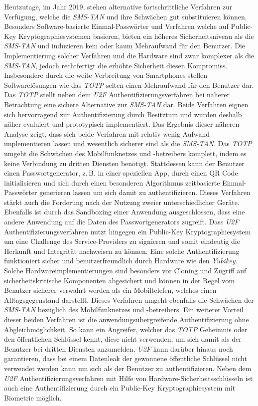 \documentclass[11pt,a4paper,ngerman]{scrreprt}
\begin{document}
Heutzutage, im Jahr 2019, stehen alternative fortschrittliche Verfahren zur Verfügung, welche die \textit{SMS-TAN} und ihre Schwächen gut substituieren können. Besonders Software-basierte Einmal-Passwörter und Verfahren welche auf Public-Key Kryptographiesystemen basieren, bieten ein höheres Sicherheitsniveau als die \textit{SMS-TAN} und induzieren kein oder kaum Mehraufwand für den Benutzer. Die Implementierung solcher Verfahren und die Hardware sind zwar komplexer als die \textit{SMS-TAN}, jedoch rechtfertigt die erhöhte Sicherheit diesen Kompromiss. Insbesondere durch die weite Verbreitung von Smartphones stellen Softwarelösungen wie das \textit{TOTP} selten einen Mehraufwand für den Benutzer dar. Das \textit{TOTP} stellt neben dem \textit{U2F} Authentifizierungsverfahren bei näherer Betrachtung eine sichere Alternative zur \textit{SMS-TAN} dar. Beide Verfahren eignen sich hervorragend zur Authentifizierung durch Besitztum und wurden deshalb näher evaluiert und prototypisch implementiert. Das Ergebnis dieser näheren Analyse zeigt, dass sich beide Verfahren mit relativ wenig Aufwand implementieren lassen und wesentlich sicherer sind als die \textit{SMS-TAN}. Das \textit{TOTP} umgeht die Schwächen des Mobilfunknetzes und -betreibers komplett, indem es keine Verbindung zu dritten Diensten benötigt. Stattdessen kann der Benutzer einen Passwortgenerator, z.\,B. in einer speziellen App, durch einen QR Code initialisieren und sich durch einen besonderen Algorithmus zeitbasierte Einmal-Passwörter generieren lassen um sich damit zu authentifizieren. Dieses Verfahren stärkt auch die Forderung nach der Nutzung zweier unterschiedlicher Geräte. Ebenfalls ist durch das Sandboxing einer Anwendung ausgeschlossen, dass eine andere Anwendung auf die Daten des Passwortgenerators zugreift. Dass \textit{U2F} Authentifizierungsverfahren nutzt hingegen ein Public-Key Kryptographiesystem um eine Challenge des Service-Providers zu signieren und somit eindeutig die Herkunft und Integrität nachweisen zu können. Eine solche Authentifizierung funktioniert sicher und benutzerfreundlich durch Hardware wie den \textit{Yubikey}. Solche Hardwareimplementierungen sind besonders vor Cloning und Zugriff auf sicherheitskritische Komponenten abgesichert und können in der Regel vom Benutzer sicherer verwahrt werden als ein Mobiltelefen, welches einen Alltagsgegenstand darstellt. Dieses Verfahren umgeht ebenfalls die Schwächen der \textit{SMS-TAN} bezüglich des Mobilfunknetzes und -betreibers. Ein weiterer Vorteil dieser beiden Verfahren ist die anwendungsübergreifende Authentifizierung ohne Abgleichmöglichkeit. So kann ein Angreifer, welcher das \textit{TOTP} Geheimnis oder den öffentlichen Schlüssel kennt, diese nicht verwenden, um sich damit als der Benutzer bei dritten Diensten anzumelden. \textit{U2F} kann darüber hinaus noch garantieren, dass bei einem Datenleak der gewonnene öffentliche Schlüssel nicht verwendet werden kann um sich als der Benutzer zu authentifizieren. Neben dem \textit{U2F} Authentifizierungsverfahren mit Hilfe von Hardware-Sicherheitsschlüsseln ist auch eine Authentifizierung durch ein Public-Key Kryptographiesystem mit Biometrie möglich.
\end{document}
